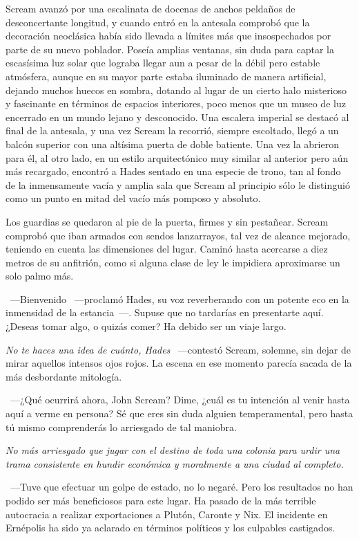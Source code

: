 Scream avanzó por una escalinata de docenas de anchos peldaños de desconcertante longitud, y cuando entró en la antesala comprobó que la decoración neoclásica había sido llevada a límites más que insospechados por parte de su nuevo poblador. Poseía amplias ventanas, sin duda para captar la escasísima luz solar que lograba llegar aun a pesar de la débil pero estable atmósfera, aunque en su mayor parte estaba iluminado de manera artificial, dejando muchos huecos en sombra, dotando al lugar de un cierto halo misterioso y fascinante en términos de espacios interiores, poco menos que un museo de luz encerrado en un mundo lejano y desconocido. Una escalera imperial se destacó al final de la antesala, y una vez Scream la recorrió, siempre escoltado, llegó a un balcón superior con una altísima puerta de doble batiente. Una vez la abrieron para él, al otro lado, en un estilo arquitectónico muy similar al anterior pero aún más recargado, encontró a Hades sentado en una especie de trono, tan al fondo de la inmensamente vacía y amplia sala que Scream al principio sólo le distinguió como un punto en mitad del vacío más pomposo y absoluto.

Los guardias se quedaron al pie de la puerta, firmes y sin pestañear. Scream comprobó que iban armados con sendos lanzarrayos, tal vez de alcance mejorado, teniendo en cuenta las dimensiones del lugar. Caminó hasta acercarse a diez metros de su anfitrión, como si alguna clase de ley le impidiera aproximarse un solo palmo más.

~---Bienvenido ~---proclamó Hades, su voz reverberando con un potente eco en la inmensidad de la estancia~---. Supuse que no tardarías en presentarte aquí. ¿Deseas tomar algo, o quizás comer? Ha debido ser un viaje largo.

\emph{No te haces una idea de cuánto, Hades} ~---contestó Scream, solemne, sin dejar de mirar aquellos intensos ojos rojos. La escena en ese momento parecía sacada de la más desbordante mitología.

~---¿Qué ocurrirá ahora, John Scream? Dime, ¿cuál es tu intención al venir hasta aquí a verme en persona? Sé que eres sin duda alguien temperamental, pero hasta tú mismo comprenderás lo arriesgado de tal maniobra.

\emph{No más arriesgado que jugar con el destino de toda una colonia para urdir una trama consistente en hundir económica y moralmente a una ciudad al completo.}

~---Tuve que efectuar un golpe de estado, no lo negaré. Pero los resultados no han podido ser más beneficiosos para este lugar. Ha pasado de la más terrible autocracia a realizar exportaciones a Plutón, Caronte y Nix. El incidente en Ernépolis ha sido ya aclarado en términos políticos y los culpables castigados.


